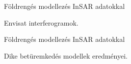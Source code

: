 \def\ft{Földrengés modellezés InSAR adatokkal}

\begin{frame}{\ft}
    \begin{minic}{0.8}
    \end{minic}
    \centering
    
    Envisat interferogramok.
\end{frame}

\begin{frame}{\ft}
    \begin{minipage}[c]{0.4\textwidth}
        
    \end{minipage}
    \hspace{15pt}
    \begin{minipage}[c]{0.4\textwidth}
        
        Dike betüremkedés modellek eredményei.
    \end{minipage}
\end{frame}
